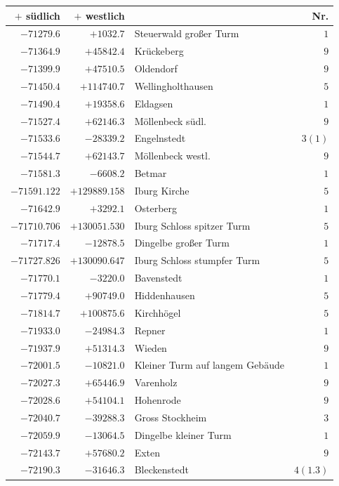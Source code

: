 \begin{center}\begingroup\fontsize{8}{9}\selectfont
\setlength{\tabcolsep}{4pt}
\begin{tabular}{r|r|p{170pt}|r}\hline
\(+\) südlich&\(+\) westlich&&Nr.\\\hline
\(-71279.6\)&\(+1032.7\)&Steuerwald großer Turm&\(1\)\\
\(-71364.9\)&\(+45842.4\)&Krückeberg&\(9\)\\
\(-71399.9\)&\(+47510.5\)&Oldendorf&\(9\)\\
\(-71450.4\)&\(+114740.7\)&Wellingholthausen&\(5\)\\
\(-71490.4\)&\(+19358.6\)&Eldagsen&\(1\)\\
\(-71527.4\)&\(+62146.3\)&Möllenbeck südl.&\(9\)\\
\(-71533.6\)&\(-28339.2\)&Engelnstedt&\(3 (1)\)\\
\(-71544.7\)&\(+62143.7\)&Möllenbeck westl.&\(9\)\\
\(-71581.3\)&\(-6608.2\)&Betmar&\(1\)\\
\(-71591.122\)&\(+129889.158\)&Iburg Kirche&\(5\)\\
\(-71642.9\)&\(+3292.1\)&Osterberg&\(1\)\\
\(-71710.706\)&\(+130051.530\)&Iburg Schloss spitzer Turm&\(5\)\\
\(-71717.4\)&\(-12878.5\)&Dingelbe großer Turm&\(1\)\\
\(-71727.826\)&\(+130090.647\)&Iburg Schloss stumpfer Turm&\(5\)\\
\(-71770.1\)&\(-3220.0\)&Bavenstedt&\(1\)\\
\(-71779.4\)&\(+90749.0\)&Hiddenhausen&\(5\)\\
\(-71814.7\)&\(+100875.6\)&Kirchhögel&\(5\)\\
\(-71933.0\)&\(-24984.3\)&Repner&\(1\)\\
\(-71937.9\)&\(+51314.3\)&Wieden&\(9\)\\
\(-72001.5\)&\(-10821.0\)&Kleiner Turm auf langem Gebäude&\(1\)\\
\(-72027.3\)&\(+65446.9\)&Varenholz&\(9\)\\
\(-72028.6\)&\(+54104.1\)&Hohenrode&\(9\)\\
\(-72040.7\)&\(-39288.3\)&Gross Stockheim&\(3\)\\
\(-72059.9\)&\(-13064.5\)&Dingelbe kleiner Turm&\(1\)\\
\(-72143.7\)&\(+57680.2\)&Exten&\(9\)\\
\(-72190.3\)&\(-31646.3\)&Bleckenstedt&\(4(1.3)\)\\

\end{tabular}
\end{center}
